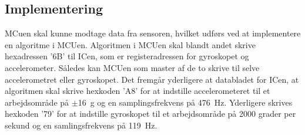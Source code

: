 \subsection{Implementering}
MCuen skal kunne modtage data fra sensoren, hvilket udførs ved at implementere en algoritme i MCUen. Algoritmen i MCUen skal blandt andet skrive hexadressen '6B' til ICen, som er registeradressen for gyroskopet og accelerometer. Således kan MCUen som master af de to skrive til selve accelerometret eller gyroskopet. Det fremgår yderligere at databladet for ICen, at algoritmen skal skrive hexkoden 'A8' for at indstille accelerometeret til et arbejdsområde på $\pm$16~g og en samplingsfrekvens på 476~Hz. Yderligere skrives hexkoden '79' for at indstille gyroskopet til et arbejdsområde på 2000 grader per sekund og en samlingsfrekvens på 119~Hz. \citep{STMicroelectronics2016}

